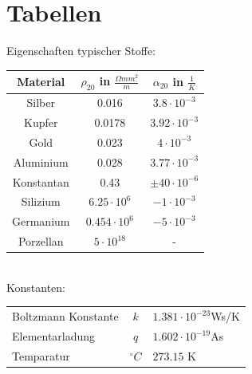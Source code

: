 \documentclass[margin=normal]{tex/hsrzf}
\begin{document}
    \section*{Tabellen}

Eigenschaften typischer Stoffe:\\
\begin{tabular}{|ccc|}
  \hline
  Material   & $\rho_{20}$ in $\frac{\Omega mm^2}{m}$ & $\alpha_{20}$ in $\frac{1}{K}$ \\[3pt]
  \hline
  Silber     & 0.016                                  & $3.8 \cdot 10^{-3}$            \\[3pt]
  \rowcolor[gray]{.9}
  Kupfer     & 0.0178                                 & $3.92 \cdot 10^{-3}$           \\[3pt]
  Gold       & 0.023                                  & $4 \cdot 10^{-3}$              \\[3pt]
  \rowcolor[gray]{.9}
  Aluminium  & 0.028                                  & $3.77 \cdot 10^{-3}$           \\[3pt]
  Konstantan & 0.43                                   & $\pm 40 \cdot 10^{-6}$         \\[3pt]
  \rowcolor[gray]{.9}
  Silizium   & $6.25 \cdot 10^6$                      & $-1\cdot 10^{-3} $             \\[3pt]
  Germanium  & $0.454 \cdot 10^6$                     & $-5\cdot 10^{-3} $             \\[3pt]
  \rowcolor[gray]{.9}
  Porzellan  & $5 \cdot 10^18$                        & -                              \\[3pt]
  \hline
\end{tabular}
\\

Konstanten: \\
\begin{tabular}{|lcl|}
  \hline
  Boltzmann Konstante & $k$        & $1.381 \cdot 10^{-23}$Ws/K \\[2pt]
  \rowcolor[gray]{.9}
  Elementarladung     & $q$        & $1.602 \cdot 10^{-19}$As   \\[2pt]
  Temparatur          & $^\circ C$ & $273.15$ K                 \\
  \hline
\end{tabular}
\end{document}

